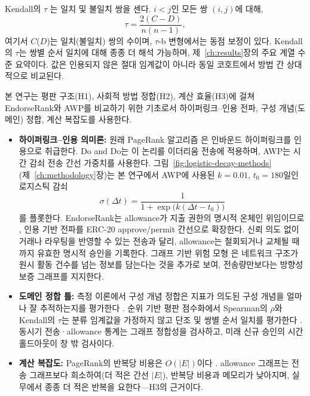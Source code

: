 Kendall의 $\tau$ 는 일치 및 불일치 쌍을 센다. $i<j$인 모든 쌍 $(i,j)$에 대해,
\begin{equation}
\tau = \frac{2(C - D)}{n(n-1)},
\label{eq:kendall}
\end{equation}
여기서 $C$($D$)는 일치(불일치) 쌍의 수이며, $\tau$-b 변형에서는 동점 보정이 있다. Kendall의 $\tau$는 쌍별 순서 일치에 대해 종종 더 해석 가능하며, 제~\ref{ch:results}장의 주요 계열 수준 요약이다. 값은 인용되지 않은 절대 임계값이 아니라 동일 코호트에서 방법 간 상대적으로 비교된다.


본 연구는 평판 구조(H1), 사회적 방법 정합(H2), 계산 효율(H3)에 걸쳐 EndorseRank와 AWP를 비교하기 위한 기초로서 하이퍼링크--인용 전파, 구성 개념(도메인) 정합, 계산 복잡도를 사용한다.

\begin{itemize}
\item \textbf{하이퍼링크--인용 의미론:} 원래 PageRank 알고리즘 은 인바운드 하이퍼링크를 인용으로 취급한다. Do and Do는 이 논리를 이더리움 전송에 적용하며, AWP는 시간 감쇠 전송 간선 가중치를 사용한다. 그림~\ref{fig:logistic-decay-methods}(제~\ref{ch:methodology}장)는 본 연구에서 AWP에 사용된 $k=0.01$, $t_0=180$일인 로지스틱 감쇠
\begin{equation}
\sigma(\Delta t)=\frac{1}{1+\exp\bigl(k(\Delta t-t_0)\bigr)}
\label{eq:logistic}
\end{equation}
를 플롯한다. EndorseRank는 allowance가 지출 권한의 명시적 온체인 위임이므로 , 인용 기반 전파를 ERC-20 approve/permit 간선으로 확장한다. 신뢰 의도 없이 거래나 라우팅을 반영할 수 있는 전송과 달리, allowance는 철회되거나 교체될 때까지 유효한 명시적 승인을 기록한다. 그래프 기반 위험 모형 은 네트워크 구조가 원시 활동 건수를 넘는 정보를 담는다는 것을 추가로 보여, 전송량만보다는 방향성 보증 그래프를 지지한다.

\item \textbf{도메인 정합 틀:} 측정 이론에서 구성 개념 정합은 지표가 의도된 구성 개념을 얼마나 잘 추적하는지를 평가한다 . 순위 기반 평판 점수화에서 Spearman의 $\rho$와 Kendall의 $\tau$는 분류 임계값을 가정하지 않고 단조 및 쌍별 순서 일치를 평가한다 . 동시기 전송·allowance 통계는 그래프 정합성을 검사하고, 미래 신규 승인의 시간 홀드아웃이 창 밖 검사이다.

\item \textbf{계산 복잡도:} PageRank의 반복당 비용은 $O(|E|)$이다 . allowance 그래프는 전송 그래프보다 희소하여(더 적은 간선 $|E|$), 반복당 비용과 메모리가 낮아지며, 실무에서 종종 더 적은 반복을 요한다---H3의 근거이다.
\end{itemize}

